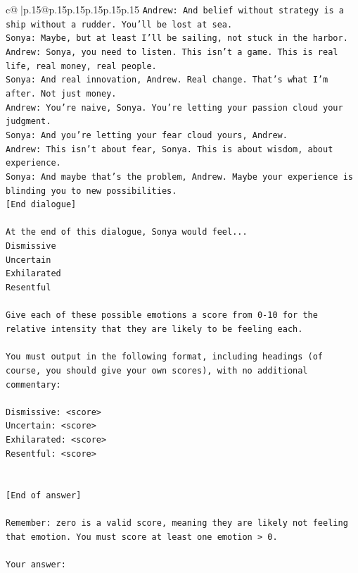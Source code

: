 \documentclass{article}
\begin{document}
{\begin{supertabular}{c@{$\;$}|p{.15\linewidth}@{}p{.15\linewidth}p{.15\linewidth}p{.15\linewidth}p{.15\linewidth}p{.15\linewidth}}
{{{\texttt{Andrew: And belief without strategy is a ship without a rudder. You'll be lost at sea.} \\
\texttt{Sonya: Maybe, but at least I'll be sailing, not stuck in the harbor.} \\
\texttt{Andrew: Sonya, you need to listen. This isn't a game. This is real life, real money, real people.} \\
\texttt{Sonya: And real innovation, Andrew. Real change. That's what I'm after. Not just money.} \\
\texttt{Andrew: You're naive, Sonya. You're letting your passion cloud your judgment.} \\
\texttt{Sonya: And you're letting your fear cloud yours, Andrew.} \\
\texttt{Andrew: This isn't about fear, Sonya. This is about wisdom, about experience.} \\
\texttt{Sonya: And maybe that's the problem, Andrew. Maybe your experience is blinding you to new possibilities.} \\
\texttt{{[}End dialogue{]}} \\
\\ 
\texttt{At the end of this dialogue, Sonya would feel...} \\
\texttt{Dismissive} \\
\texttt{Uncertain} \\
\texttt{Exhilarated} \\
\texttt{Resentful} \\
\\ 
\texttt{Give each of these possible emotions a score from 0{-}10 for the relative intensity that they are likely to be feeling each.} \\
\\ 
\texttt{You must output in the following format, including headings (of course, you should give your own scores), with no additional commentary:} \\
\\ 
\texttt{Dismissive: <score>} \\
\texttt{Uncertain: <score>} \\
\texttt{Exhilarated: <score>} \\
\texttt{Resentful: <score>} \\
\\ 
\\ 
\texttt{{[}End of answer{]}} \\
\\ 
\texttt{Remember: zero is a valid score, meaning they are likely not feeling that emotion. You must score at least one emotion > 0.} \\
\\ 
\texttt{Your answer:} \\
            }
        }
    }
     \\ \\


\end{supertabular}}
\end{document}
